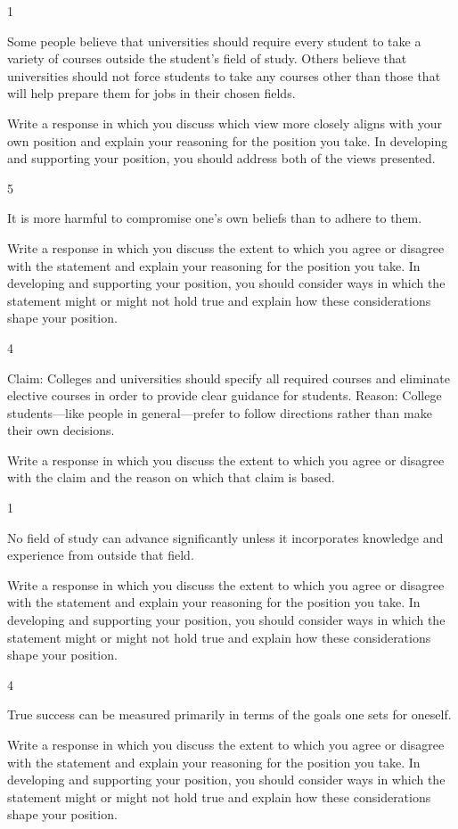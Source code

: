 \documentclass[]{article}
\begin{document}
1

Some people believe that universities should require every student to
take a variety of courses outside the student's field of study. Others
believe that universities should not force students to take any courses
other than those that will help prepare them for jobs in their chosen
fields.

Write a response in which you discuss which view more closely aligns
with your own position and explain your reasoning for the position you
take. In developing and supporting your position, you should address
both of the views presented.

5

It is more harmful to compromise one's own beliefs than to adhere to
them.

Write a response in which you discuss the extent to which you agree or
disagree with the statement and explain your reasoning for the position
you take. In developing and supporting your position, you should
consider ways in which the statement might or might not hold true and
explain how these considerations shape your position.

4

Claim: Colleges and universities should specify all required courses and
eliminate elective courses in order to provide clear guidance for
students. Reason: College students---like people in general---prefer to
follow directions rather than make their own decisions.

Write a response in which you discuss the extent to which you agree or
disagree with the claim and the reason on which that claim is based.

1

No field of study can advance significantly unless it incorporates
knowledge and experience from outside that field.

Write a response in which you discuss the extent to which you agree or
disagree with the statement and explain your reasoning for the position
you take. In developing and supporting your position, you should
consider ways in which the statement might or might not hold true and
explain how these considerations shape your position.

4

True success can be measured primarily in terms of the goals one sets
for oneself.

Write a response in which you discuss the extent to which you agree or
disagree with the statement and explain your reasoning for the position
you take. In developing and supporting your position, you should
consider ways in which the statement might or might not hold true and
explain how these considerations shape your position.
\end{document}
